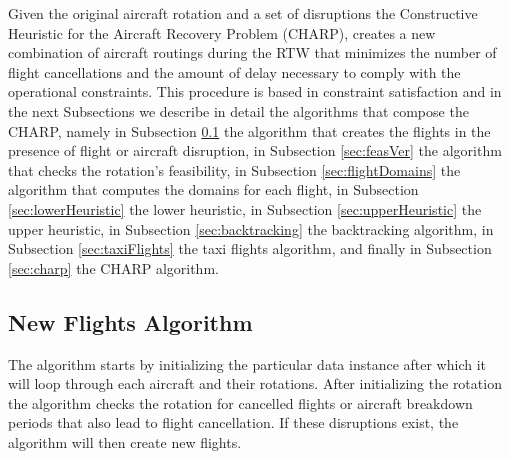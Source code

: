 

\newcommand\mycommfont[1]{\footnotesize\ttfamily\textcolor{blue}{#1}}



%
	
	Given the original aircraft rotation and a set of disruptions the Constructive Heuristic for the Aircraft Recovery Problem (CHARP), creates a new combination of aircraft routings during the RTW that minimizes the number of flight cancellations and the amount of delay necessary to comply with the operational constraints. This procedure is based in constraint satisfaction  and in the next Subsections we describe in detail the algorithms that compose the CHARP, namely in Subsection \ref{sec:newFlightsAlgo} the algorithm that creates the flights in the presence of flight or aircraft disruption, in Subsection \ref{sec:feasVer}  the algorithm that checks the rotation's feasibility, in Subsection \ref{sec:flightDomains} the algorithm that computes the domains for each flight, in Subsection \ref{sec:lowerHeuristic} the lower heuristic, in Subsection \ref{sec:upperHeuristic} the upper heuristic, in Subsection \ref{sec:backtracking}  the backtracking algorithm, in Subsection \ref{sec:taxiFlights} the taxi flights algorithm, and finally in Subsection \ref{sec:charp} the CHARP algorithm.


	\subsection{New Flights Algorithm} \label{sec:newFlightsAlgo}
	
	The algorithm starts by initializing the particular data instance after which it will loop through each aircraft and their rotations. After initializing the rotation the algorithm checks the rotation for cancelled flights or aircraft breakdown periods that also lead to flight cancellation. If these disruptions exist, the algorithm will then create new flights.
	
